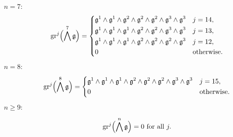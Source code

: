 \begin{description}
  \item[$n=7:$]
        \begin{equation*}
          \operatorname{gr}^{j}\Bigl( \bigwedge^{7}\mathfrak{g} \Bigr) =
          \begin{dcases}
            \mathfrak{g}^{1} \wedge \mathfrak{g}^{1} \wedge \mathfrak{g}^{2} \wedge \mathfrak{g}^{2} \wedge \mathfrak{g}^{2} \wedge \mathfrak{g}^{3} \wedge \mathfrak{g}^{3}                    & j=14, \\
            \mathfrak{g}^{1} \wedge \mathfrak{g}^{1} \wedge \mathfrak{g}^{1} \wedge \mathfrak{g}^{2} \wedge \mathfrak{g}^{2} \wedge \mathfrak{g}^{3} \wedge \mathfrak{g}^{3}                    & j=13, \\
            \mathfrak{g}^{1} \wedge \mathfrak{g}^{1} \wedge \mathfrak{g}^{1} \wedge \mathfrak{g}^{2} \wedge \mathfrak{g}^{2} \wedge \mathfrak{g}^{2} \wedge \mathfrak{g}^{3}                    & j=12, \\
            0                                                                                                               & \text{otherwise.}
          \end{dcases}
        \end{equation*}

  \item[$n=8:$]
        \begin{equation*}
          \operatorname{gr}^{j}\Bigl( \bigwedge^{8}\mathfrak{g} \Bigr) =
          \begin{dcases}
            \mathfrak{g}^{1} \wedge \mathfrak{g}^{1} \wedge \mathfrak{g}^{1} \wedge \mathfrak{g}^{2} \wedge \mathfrak{g}^{2} \wedge \mathfrak{g}^{2} \wedge \mathfrak{g}^{3} \wedge \mathfrak{g}^{3} & j=15, \\
            0                                                                                                         & \text{otherwise.}
          \end{dcases}
        \end{equation*}

   \item[$n\geq9:$]
        \begin{equation*}
          \operatorname{gr}^{j}\Bigl( \bigwedge^{n}\mathfrak{g} \Bigr) = 0 \text{ for all } j.
        \end{equation*}
\end{description}

